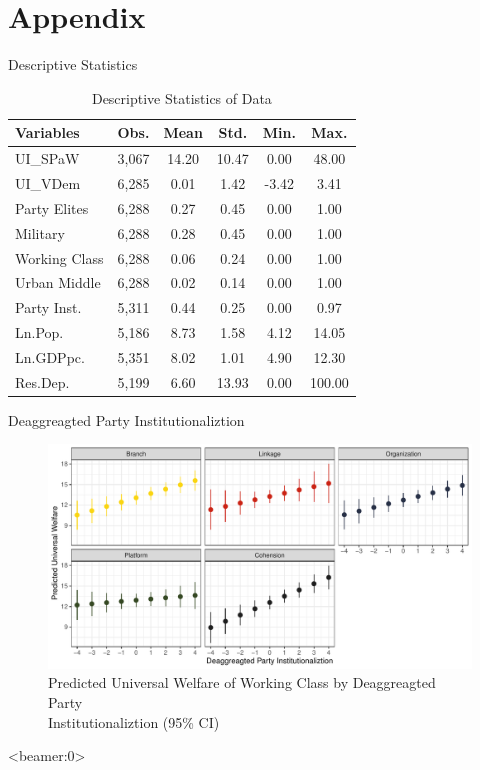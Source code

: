 \documentclass{Bredelebeamer}
\begin{document}
\section{Appendix}
\begin{frame}{Descriptive Statistics}
	\begin{table}[ht]
		\centering
		\begin{tabular}{lccccc}
			\hline
			Variables & Obs. & Mean & Std. & Min. & Max. \\ 
			\hline
			UI\_SPaW & 3,067 & 14.20 & 10.47 & 0.00 & 48.00 \\ 
			UI\_VDem & 6,285 & 0.01 & 1.42 & -3.42 & 3.41 \\ 
			Party Elites & 6,288 & 0.27 & 0.45 & 0.00 & 1.00 \\ 
			Military & 6,288 & 0.28 & 0.45 & 0.00 & 1.00 \\ 
			Working Class & 6,288 & 0.06 & 0.24 & 0.00 & 1.00 \\ 
			Urban Middle & 6,288 & 0.02 & 0.14 & 0.00 & 1.00 \\ 
			Party Inst. & 5,311 & 0.44 & 0.25 & 0.00 & 0.97 \\ 
			Ln.Pop. & 5,186 & 8.73 & 1.58 & 4.12 & 14.05 \\ 
			Ln.GDPpc. & 5,351 & 8.02 & 1.01 & 4.90 & 12.30 \\ 
			Res.Dep. & 5,199 & 6.60 & 13.93 & 0.00 & 100.00 \\ 
			\hline
		\end{tabular}
	\label{tab:tab1} \caption{Descriptive Statistics of Data}
	\end{table}
\end{frame}
\begin{frame}{Deaggreagted Party Institutionaliztion}
	\begin{figure}[!htbt]
		\centering
		\includegraphics[width=1\linewidth]{"../3. Datasets_Codebooks/Figures/Plot7"}
		\caption{Predicted Universal Welfare of Working Class by Deaggreagted Party\\Institutionaliztion (95\% CI)}
		\label{fig:plot7}
	\end{figure}
\end{frame}
\begin{frame}<beamer:0>
	
	
\end{frame}
\end{document}
